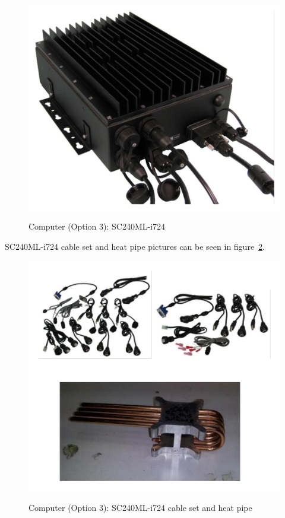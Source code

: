 \begin{figure}
  \centering
  \includegraphics[angle=90,width=1\columnwidth]{figs/body02/FIGDEVICEPCOPTION3.pdf}\\
  \caption[Computer (Option 3): SC240ML-i724]{Computer (Option 3): SC240ML-i724}
  \label{FIG:DEVICEPCOPTION3}
\end{figure}
SC240ML-i724 cable set and heat pipe pictures can be seen in figure~\ref{FIG:DEVICEPCOPTION3CABLE}.
\begin{figure}
  \centering
  \includegraphics[angle=90,width=1\columnwidth]{figs/body02/FIGDEVICEPCOPTION3CABLE.pdf}\\
  \caption[Computer (Option 3): SC240ML-i724 cable set and heat pipe]{Computer (Option 3): SC240ML-i724 cable set and heat pipe}
  \label{FIG:DEVICEPCOPTION3CABLE}
\end{figure}

